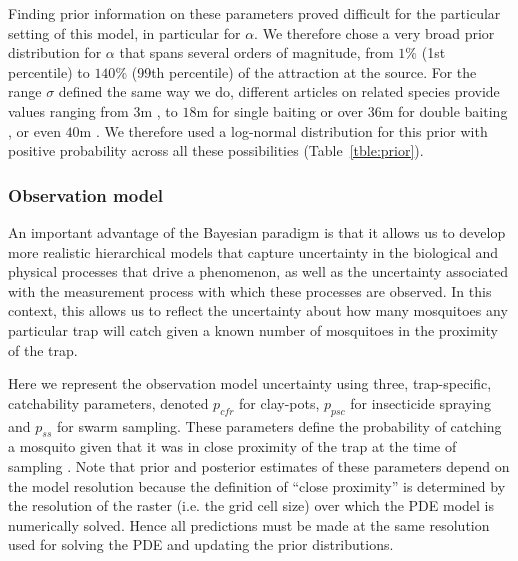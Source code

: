 \documentclass[]{bmcart}
\newcommand{\va}{{\alpha}}
\begin{document}
Finding prior information on these parameters proved difficult for the particular setting of this model, in particular for $\va$. We therefore chose a very broad prior distribution for $\va$ that spans several orders of magnitude, from $1\%$ (1st percentile) to $140\%$ (99th percentile) of the attraction at the source. For the range $\sigma$ defined the same way we do, different articles on related species provide values ranging from $3$m \cite{McIver1989}, to $18$m for single baiting or over $36$m for double baiting \cite{Gillies1972}, or even $40$m \cite{Zhu2015}. We therefore used a log-normal distribution for this prior with positive probability across all these possibilities (Table~\ref{tble:prior}). 

\subsubsection{Observation model}
An important advantage of the Bayesian paradigm is that it allows us to develop more realistic hierarchical models that capture uncertainty in the biological and physical processes that drive a phenomenon, as well as the uncertainty associated with the measurement process with which these processes are observed. In this context, this allows us to reflect the uncertainty about how many mosquitoes any particular trap will catch given a known number of mosquitoes in the proximity of the trap.

Here we represent the observation model uncertainty using three, trap-specific, catchability parameters, denoted $p_{cfr}$ for clay-pots, $p_{psc}$ for insecticide spraying and $p_{ss}$ for swarm sampling. These parameters define the probability of catching a mosquito given that it was in close proximity of the trap at the time of sampling \cite{Martin2005a}. Note that prior and posterior estimates of these parameters depend on the model resolution because the definition of ``close proximity'' is determined by the resolution of the raster (i.e. the grid cell size) over which the PDE model is numerically solved. Hence all predictions must be made at the same resolution used for solving the PDE and updating the prior distributions. 
\end{document}
